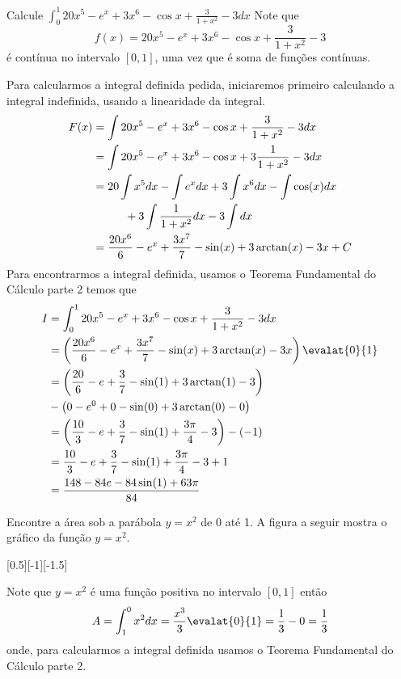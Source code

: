 \begin{example}
  Calcule
  \(
    \int_0^1 20x^5-e^x+ 3x^6- \cos x+ \frac{3}{1+x^2}-3 dx
  \)
  \solution
  Note que
  \[
    f(x)=20x^5-e^x+ 3x^6- \cos x+ \frac{3}{1+x^2}-3
  \]
  é contínua no
  intervalo $[0, 1]$, uma vez que é soma de funções contínuas.

  Para calcularmos a integral definida pedida, iniciaremos primeiro calculando
  a integral indefinida, usando a linearidade da integral.
  \begin{align*}
    F(x)
    & = \int 20x^5-e^x+ 3x^6 - \cos x+  \frac{3}{1+x^2}-3 dx \\
    & = \int 20x^5-e^x+ 3x^6 - \cos x+ 3\frac{1}{1+x^2}-3 dx \\
    & = 20 \int x^5 dx
      -    \int e^x dx
      + 3  \int x^6 dx
      -    \int \cos(x) dx \\
    & \hspace{10mm}
      + 3  \int \frac{1}{1+x^2} dx
      - 3  \int dx \\
    & = \frac{20x^6}{6}
      - e^x
      + \frac{3x^7}{7}
      - \sin(x)
      + 3\arctan(x)
      - 3x + C
  \end{align*}
  Para encontrarmos a integral definida, usamos o Teorema Fundamental do
  Cálculo parte 2 temos que
  \begin{align*}
    I
    & = \int_0^1 20x^5-e^x+ 3x^6- \cos x+ \frac{3}{1+x^2}-3 dx \\
    & = \left( \frac{20x^6}{6}
      - e^x
      + \frac{3x^7}{7}
      - \sin(x)
      + 3\arctan(x)
      - 3x \right) \evalat{0}{1} \\
    & = \left( \frac{20}{6}
      - e
      + \frac{3}{7}
      - \sin(1)
      + 3 \arctan(1)
      - 3 \right) \\
    & - \left( 0 - e^0 + 0 - \sin(0) + 3\arctan(0) - 0 \right) \\
    & = \left(\frac{10}{3}-e+\frac{3}{7}-\sin(1) + \frac{3\pi}{4} - 3 \right) - (-1) \\
    & = \frac{10}{3} - e + \frac{3}{7} - \sin(1) + \frac{3\pi}{4} - 3 + 1 \\
    & = \frac{148 - 84e - 84 \sin(1) + 63 \pi}{84}
  \end{align*}
\end{example}


\begin{example}
  Encontre a área sob a parábola $y=x^2$ de 0 até 1.
  \solution
  A figura a seguir mostra o gráfico da função $y=x^2$.

  [0.5][-1][-1.5]

  Note que $y=x^2$ é uma função positiva no intervalo $[0, 1]$
  então
  \[
    A
    = \int^{0}_{1} x^2 dx
    = \frac{x^3}{3} \evalat{0}{1}
    = \frac{1}{3}-0
    = \frac{1}{3}
  \]
  onde, para calcularmos a integral definida usamos o
  Teorema Fundamental do Cálculo parte 2.
\end{example}

